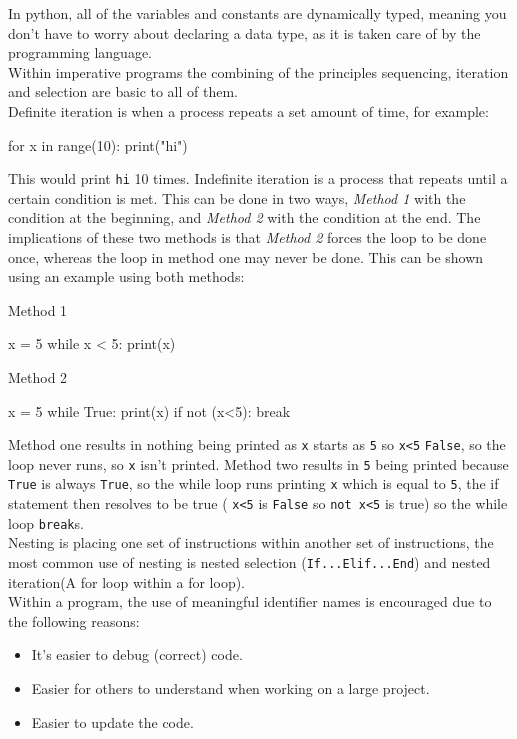   In python, all of the variables and constants are dynamically typed, meaning you don't have to worry about declaring a data type, as it is taken care of by the programming language. \\
  Within imperative programs the combining of the principles sequencing, iteration and selection are basic to all of them.\\
  Definite iteration is when a process repeats a set amount of time, for example:
  \begin{python}
for x in range(10):
	print("hi")\end{python}
  This would print \verb|hi| 10 times. Indefinite iteration is a process that repeats until a certain condition is met. This can be done in two ways, \textit{Method 1} with the condition at the beginning, and \textit{Method 2} with the condition at the end. The implications of these two methods is that \textit{Method 2} forces the loop to be done once, whereas the loop in method one may never be done. This can be shown using an example using both methods:
  \begin{multicols}{2}
    Method 1
    \begin{python}
x = 5
while x < 5:
	print(x)\end{python}

    \columnbreak
    Method 2
    \begin{python}
x = 5
while True:
	print(x)
	if not (x<5):
		break \end{python}

  \end{multicols}
  \noindent
  Method one results in nothing being printed as \verb|x| starts as \verb|5| so \verb|x<5| \verb|False|, so the loop never runs, so \verb|x| isn't printed. Method two results in \verb|5| being printed because \verb|True| is always \verb|True|, so the while loop runs printing \verb|x| which is equal to \verb|5|, the if statement then resolves to be true ( \verb|x<5| is \verb|False| so \verb|not x<5| is true) so the while loop \verb|break|s.\\
  Nesting is placing one set of instructions within another set of instructions, the most common use of nesting is nested selection (\verb|If...Elif...End|) and nested iteration(A for loop within a for loop).\\
  Within a program, the use of meaningful identifier names is encouraged due to the following reasons:
  \begin{itemize}
    \setlength\itemsep{0em}
    \item It's easier to debug (correct) code.
    \item Easier for others to understand when working on a large project.
    \item Easier to update the code.
  \end{itemize}
